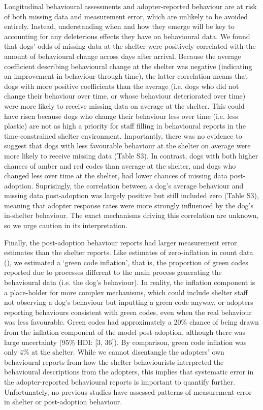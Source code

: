 \documentclass[12pt]{article}
\begin{document}
Longitudinal behavioural assessments and adopter-reported behaviour are at risk of both missing data and measurement error, which are unlikely to be avoided entirely. Instead, understanding when and how they emerge will be key to accounting for any deleterious effects they have on behavioural data. We found that dogs' odds of missing data at the shelter were positively correlated with the amount of behavioural change across days after arrival. Because the average coefficient describing behavioural change at the shelter was negative (indicating an improvement in behaviour through time), the latter correlation means that dogs with more positive coefficients than the average (i.e. dogs who did not change their behaviour over time, or whose behaviour deteriorated over time) were more likely to receive missing data on average at the shelter. This could have risen because dogs who change their behaviour less over time (i.e. less plastic) are not as high a priority for staff filling in behavioural reports in the time-constrained shelter environment. Importantly, there was no evidence to suggest that dogs with less favourable behaviour at the shelter on average were more likely to receive missing data (Table S3). In contrast, dogs with both higher chances of amber and red codes than average at the shelter, and dogs who changed less over time at the shelter, had lower chances of missing data post-adoption. Suprisingly, the correlation between a dog's average behaviour and missing data post-adoption was largely positive but still included zero (Table S3), meaning that adopter response rates were more strongly influenced by the dog's in-shelter behaviour. The exact mechanisms driving this correlation are unknown, so we urge caution in its interpretation.

Finally, the post-adoption behaviour reports had larger measurement error estimates than the shelter reports. Like estimates of zero-inflation in count data (\cite{lambert1992}), we estimated a `green code inflation', that is, the proportion of green codes reported due to processes different to the main process generating the behavioural data (i.e. the dog's behaviour). In reality, the inflation component is a place-holder for more complex mechanisms, which could include shelter staff not observing a dog's behaviour but inputting a green code anyway, or adopters reporting behaviours consistent with green codes, even when the real behaviour was less favourable. Green codes had approximately a 20\% chance of being drawn from the inflation component of the model post-adoption, although there was large uncertainty (95\% HDI: [3, 36]). By comparison, green code inflation was only 4\% at the shelter. While we cannot disentangle the adopters' own behavioural reports from how the shelter behaviourists interpreted the behavioural descriptions from the adopters, this implies that systematic error in the adopter-reported behavioural reports is important to quantify further. Unfortunately, no previous studies have assessed patterns of measurement error in shelter or post-adoption behaviour.
\end{document}
